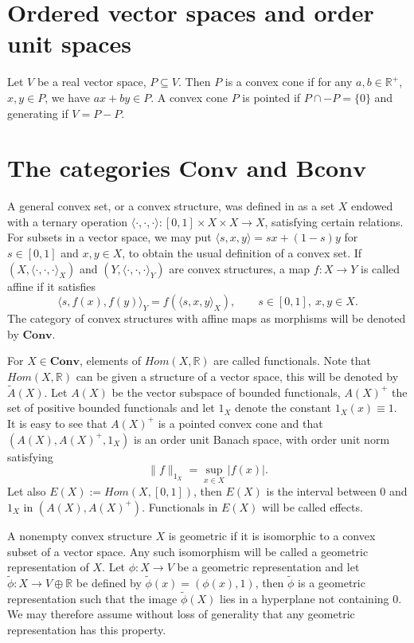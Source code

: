 \documentclass[12pt]{article}
\newcommand{\<}{\langle}
\def\>{\rangle}
\newcommand{\ct}[1]{\mathbf{#1}}
\begin{document}
\section{Ordered vector spaces and order unit spaces}

Let $V$ be a real vector space, $P\subseteq V$. Then $P$ is a convex cone if for any $a,b\in \mathbb R^+$, $x,y\in P$, we have $ax+by\in P$. A convex cone $P$ is pointed
 if $P\cap -P=\{0\}$ and generating if $V=P-P$.


\section{The categories $\ct{Conv}$ and $\ct{Bconv}$}


A general convex set, or a convex structure, was defined in \cite{gudder} as a set $X$ endowed with a ternary operation $\<\cdot,\cdot,\cdot\>: [0,1]\times X\times X\to X$,
 satisfying certain relations. For subsets in a vector space, we may put $\<s,x,y\>=sx+(1-s)y$ for $s\in [0,1]$ and $x,y\in X$, to obtain the usual definition of a convex set.  If $(X,\<\cdot,\cdot,\cdot\>_X)$ and $(Y,\<\cdot,\cdot,\cdot\>_Y)$ are convex structures, a map $f:X\to Y$ is called affine if it satisfies
\[
\<s,f(x),f(y)\>_Y=f(\<s,x,y\>_X),\qquad s\in [0,1],\ x,y\in X.
\]
The category of convex structures with affine maps as morphisms will be denoted by $\ct{Conv}$. 

For $X\in \ct{Conv}$, elements of $Hom(X,\mathbb R)$ are called functionals. Note that $Hom(X,\mathbb R)$ can be given a structure of a vector space, this will be denoted by $\widetilde A(X)$.  Let $A(X)$ be the vector subspace of bounded functionals, $A(X)^+$ the set of positive bounded functionals and let $1_X$ denote the constant $1_X(x)\equiv 1$. It is easy to see that $A(X)^+$ is a pointed convex cone and that $(A(X),A(X)^+,1_X)$ is an  order unit Banach space, with order unit norm satisfying
\[
\|f\|_{1_X}=\sup_{x\in X} |f(x)|.
\]
Let also $E(X):=Hom(X,[0,1])$, then $E(X)$ is the interval between 0 and $1_X$ in $(A(X),A(X)^+)$. Functionals in  $E(X)$ will be called effects.





A nonempty convex structure $X$ is geometric if it is isomorphic to a convex subset of a vector space. Any such isomorphism will be called a geometric representation of $X$.
Let $\phi:X\to V$ be a geometric representation and let $\tilde \phi:X\to V\oplus \mathbb R$ be defined by $\tilde \phi(x)=(\phi(x),1)$, then $\tilde \phi$ is a geometric 
representation  such that the image $\tilde \phi(X)$ lies in a hyperplane not containing 0. We may therefore assume without loss of generality  that any geometric representation has this property.
\end{document}
